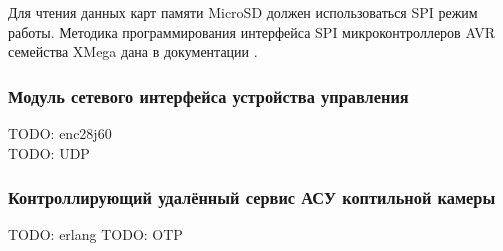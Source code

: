 \begin{par}
Для чтения данных карт памяти MicroSD должен использоваться SPI режим работы. Методика программирования
интерфейса SPI микроконтроллеров AVR семейства XMega дана в документации \cite{avrspi}.
\end{par}

\subsubsection{Модуль сетевого интерфейса устройства управления}

TODO: enc28j60 \\
TODO: UDP \\

\subsubsection{Контроллирующий удалённый сервис АСУ коптильной камеры}

TODO: erlang
TODO: OTP \\

